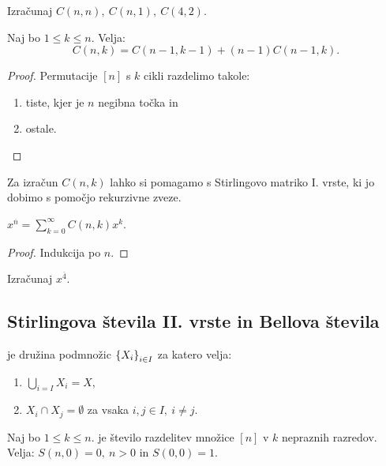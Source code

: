 \begin{primer}
    Izračunaj $C(n,n), \ C(n, 1), \ C(4,2)$.
\end{primer}

\begin{trditev}
    Naj bo $1 \leq k \leq n$. Velja:
    $$C(n, k) = C(n-1, k-1) + (n-1)C(n-1, k).$$
\end{trditev}

\begin{proof}
    Permutacije $[n]$ s $k$ cikli razdelimo takole:
    \begin{enumerate}
        \item tiste, kjer je $n$ negibna točka in
        \item ostale. \qedhere
    \end{enumerate}
\end{proof}

Za izračun $C(n,k)$ lahko si pomagamo s Stirlingovo matriko I. vrste, ki jo dobimo s pomočjo rekurzivne zveze.

\begin{trditev}
    $x^{\overline{n}} = \sum_{k=0}^{\infty}C(n,k)x^k$.
\end{trditev}

\begin{proof}
    Indukcija po $n$.
\end{proof}

\begin{primer}
    Izračunaj $x^{\overline{4}}$.
\end{primer}

\subsection{Stirlingova števila II. vrste in Bellova števila}
\begin{definicija}
     je družina podmnožic $\left\{X_i\right\}_{i \in I}$ za katero velja:
    \begin{enumerate}
        \item $\bigcup_{i=I}X_i =X$,
        \item $X_i \cap X_j = \emptyset$ za vsaka $i,j \in I, \ i \neq j$.
    \end{enumerate}
\end{definicija}

\begin{definicija}
    Naj bo $1 \leq k \leq n$.  je število razdelitev množice $[n]$ v $k$ nepraznih razredov. Velja: $S(n, 0) = 0, \ n > 0$ in $S(0,0) = 1$.
\end{definicija}

